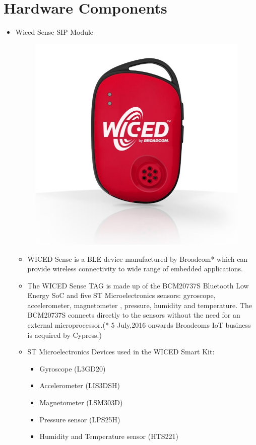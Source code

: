 \documentclass[a4paper,12pt,oneside]{book}
\begin{document}
\section{Hardware Components}
\begin{itemize}

  \item Wiced Sense SIP Module
  
        \begin{figure}[h]
    \centering
	\includegraphics[scale=0.5]{WICED_SENSE.jpg}
	\end{figure}
	

    \begin{itemize}
    \item WICED Sense is a BLE device manufactured by Broadcom* which can provide wireless connectivity to wide range of embedded applications.
    \item The WICED Sense TAG is made up of the BCM20737S Bluetooth Low Energy SoC and five ST Microelectronics sensors: gyroscope, accelerometer, magnetometer , pressure, humidity and temperature. The BCM20737S connects directly to the sensors without the need for an external microprocessor.(* 5 July,2016 onwards Broadcoms IoT business is acquired by Cypress.)
    \item ST Microelectronics Devices used in the WICED Smart Kit:
    \begin{itemize}
    \item Gyroscope (L3GD20)
    \item Accelerometer (LIS3DSH)
    \item Magnetometer (LSM303D)
    \item Pressure sensor (LPS25H)
    \item Humidity and Temperature sensor (HTS221)
    \end{itemize}
	\end{itemize}
	

\end{itemize}
\end{document}
